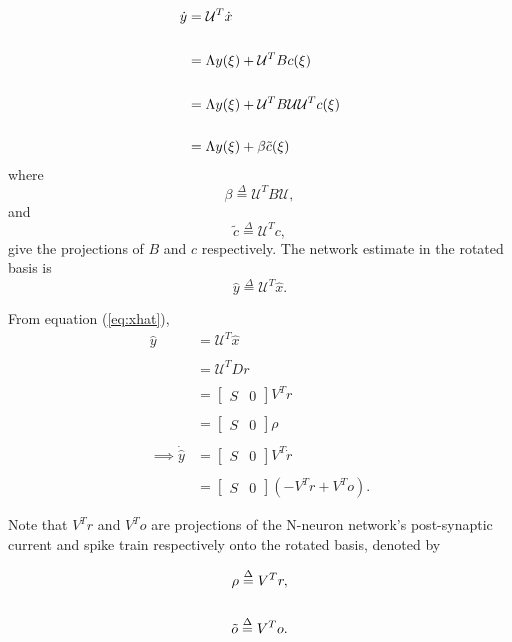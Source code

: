 \begin{enumerate}
\begin{align}
\label{eq:rotated_targed_dynamical_system}
\dot{y} &= \mathcal{U}^T \dot{x} \notag
\\ \notag
\\ \notag
&= 
\Lambda y (\xi)
+
\mathcal{U}^T B c(\xi)
\\ \notag
\\ \notag
&= 
\Lambda y (\xi)
+
\mathcal{U}^T B \mathcal{U} \mathcal{U}^T c(\xi) \notag
\\ \notag
\\ 
&=
\Lambda y (\xi)
+
\beta \tilde{c}(\xi)
\end{align}
where  
$$
\beta \overset{\Delta}{=} \mathcal{U}^T B \mathcal{U},  
$$
and
$$
\tilde{c} \overset{\Delta}{=} \mathcal{U}^T c,
$$
give the projections of $B$ and $c$ respectively.
The network estimate in the rotated basis is 
$$
\hat{y} \overset{\Delta}{=} \mathcal{U}^T \hat{x}.
$$

From equation (\ref{eq:xhat}),
\begin{align*}
\hat{y} &= \mathcal{U}^T \hat{x}
\\ 
\\ 
&=
\mathcal{U}^T D r
\\ 
\\ 
&= 
\begin{bmatrix}
S & 0
\end{bmatrix}
V^T
r
\\
\\
&=
\begin{bmatrix}
S & 0
\end{bmatrix}
\rho
\\
\\
\implies
\dot{\hat{y}}
&= 
\begin{bmatrix}
S & 0
\end{bmatrix}
V^T
\dot{r}
\\
\\
&= 
\begin{bmatrix}
S & 0
\end{bmatrix}
\left( 
-V^T r + V^T o
\right).
\end{align*}

Note that $V^T r$ and $V^T o $ are projections of the N-neuron network's post-synaptic current and spike train respectively onto the rotated basis, denoted by 

\begin{align}
\rho \overset{\Delta}{=} V^T r, 
\label{eq:def_rho}
\\ \notag
\\
\tilde{o} \overset{\Delta}{=} V^T o
\label{eq:def_o_tilde}.
\end{align}


\end{enumerate}
